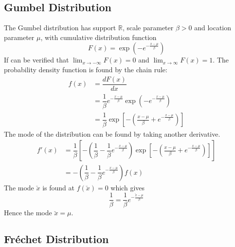 \documentclass[11pt]{report} %
\begin{document}
\subsection{Gumbel Distribution}

The Gumbel distribution has support $\mathbb{R}$, scale parameter $\beta > 0$ and location parameter $\mu$, with cumulative distribution function
\begin{equation}
F\left(x\right) = \exp\left(-e^{-\frac{x - \mu}{\beta}}\right)
\end{equation}
If can be verified that $\lim_{x\to -\infty}F\left(x\right) = 0$ and $\lim_{x\to \infty}F\left(x\right) = 1$. The probability density function is found by the chain rule:
\begin{align}
f\left(x\right) &= \dfrac{dF\left(x\right)}{dx} \\
&= \dfrac{1}{\beta}e^{-\frac{x - \mu}{\beta}}\exp\left(-e^{-\frac{x - \mu}{\beta}}\right) \\
&= \dfrac{1}{\beta}\exp\left[-\left(\frac{x - \mu}{\beta} + e^{-\frac{x - \mu}{\beta}}\right)\right]
\end{align}
The mode of the distribution can be found by taking another derivative.
\begin{align}
f'\left(x\right) &= \dfrac{1}{\beta}\left[-\left(\dfrac{1}{\beta} - \dfrac{1}{\beta}e^{-\frac{x - \mu}{\beta}}\right)\exp\left[-\left(\frac{x - \mu}{\beta} + e^{-\frac{x - \mu}{\beta}}\right)\right]\right] \\
&= -\left(\dfrac{1}{\beta} - \dfrac{1}{\beta}e^{-\frac{x - \mu}{\beta}}\right)f\left(x\right)
\end{align}
The mode $\breve{x}$ is found at $f\left(\breve{x}\right) = 0$ which gives
\begin{equation}
\dfrac{1}{\beta} = \dfrac{1}{\beta}e^{-\frac{\breve{x} - \mu}{\beta}}
\end{equation}
Hence the mode $\breve{x} = \mu$.

\subsection{Fr\'{e}chet Distribution}
\end{document}

